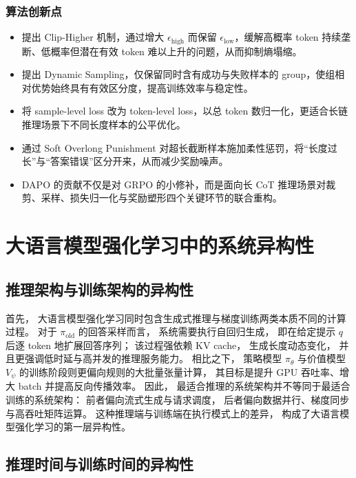 \documentclass[UTF8]{ctexart}
\begin{document}
\subsubsection{算法创新点}

\begin{itemize}
    \item 提出 Clip-Higher 机制，通过增大 $\epsilon_{\mathrm{high}}$ 而保留 $\epsilon_{\mathrm{low}}$，缓解高概率 token 持续垄断、低概率但潜在有效 token 难以上升的问题，从而抑制熵塌缩。
    \item 提出 Dynamic Sampling，仅保留同时含有成功与失败样本的 group，使组相对优势始终具有有效区分度，提高训练效率与稳定性。
    \item 将 sample-level loss 改为 token-level loss，以总 token 数归一化，更适合长链推理场景下不同长度样本的公平优化。
    \item 通过 Soft Overlong Punishment 对超长截断样本施加柔性惩罚，将“长度过长”与“答案错误”区分开来，从而减少奖励噪声。
    \item DAPO 的贡献不仅是对 GRPO 的小修补，而是面向长 CoT 推理场景对裁剪、采样、损失归一化与奖励塑形四个关键环节的联合重构。
\end{itemize}


\section{大语言模型强化学习中的系统异构性}

\subsection{推理架构与训练架构的异构性}

首先，
大语言模型强化学习同时包含生成式推理与梯度训练两类本质不同的计算过程。
对于 $\pi_{\mathrm{old}}$ 的回答采样而言，
系统需要执行自回归生成，
即在给定提示 $q$ 后逐 token 地扩展回答序列；
该过程强依赖 KV cache，
生成长度动态变化，
并且更强调低时延与高并发的推理服务能力。
相比之下，
策略模型 $\pi_\theta$ 与价值模型 $V_\psi$ 的训练阶段则更偏向规则的大批量张量计算，
其目标是提升 GPU 吞吐率、增大 batch 并提高反向传播效率。
因此，
最适合推理的系统架构并不等同于最适合训练的系统架构：
前者偏向流式生成与请求调度，
后者偏向数据并行、梯度同步与高吞吐矩阵运算。
这种推理端与训练端在执行模式上的差异，
构成了大语言模型强化学习的第一层异构性。

\subsection{推理时间与训练时间的异构性}
\end{document}
